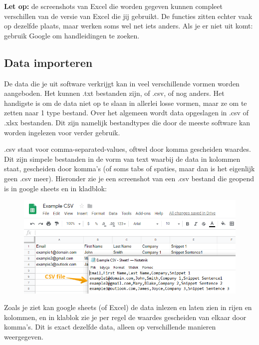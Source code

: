 \textbf{Let op:} de screenshots van Excel die worden gegeven kunnen compleet verschillen van de versie van Excel die jij gebruikt. De functies zitten echter vaak op dezelfde plaats, maar werken soms wel net iets anders. Als je er niet uit komt: gebruik Google om handleidingen te zoeken. 

\subsection{Data importeren}

De data die je uit software verkrijgt kan in veel verschillende vormen worden aangeboden. Het kunnen .txt bestanden zijn, of .csv, of nog anders. Het handigste is om de data niet op te slaan in allerlei losse vormen, maar ze om te zetten naar 1 type bestand. Over het algemeen wordt data opgeslagen in .csv of .xlsx bestanden. Dit zijn namelijk bestandtypes die door de meeste software kan worden ingelezen voor verder gebruik.

.csv staat voor comma-separated-values, oftwel door komma gescheiden waardes. Dit zijn simpele bestanden in de vorm van text waarbij de data in kolommen staat, gescheiden door komma's (of soms tabs of spaties, maar dan is het eigenlijk geen .csv meer). Hieronder zie je een screenshot van een .csv bestand die geopend is in google sheets en in kladblok:

\begin{figure}[h]
\begin{center}
\includegraphics[width=\textwidth]{img/csv_ex.png}
\end{center}
\end{figure}

Zoals je ziet kan google sheets (of Excel) de data inlezen en laten zien in rijen en kolommen, en in klablok zie je per regel de waardes gescheiden van elkaar door komma's. Dit is exact dezelfde data, alleen op verschillende manieren weergegeven. 

